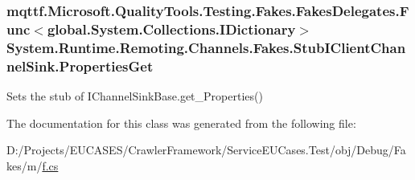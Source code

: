 \hypertarget{class_system_1_1_runtime_1_1_remoting_1_1_channels_1_1_fakes_1_1_stub_i_client_channel_sink_ac3ed92a79aa3be35b2fd586db7132eac}{
\subsubsection[{Properties\-Get}]{\setlength{\rightskip}{0pt plus 5cm}mqttf.\-Microsoft.\-Quality\-Tools.\-Testing.\-Fakes.\-Fakes\-Delegates.\-Func$<$global.\-System.\-Collections.\-I\-Dictionary$>$ System.\-Runtime.\-Remoting.\-Channels.\-Fakes.\-Stub\-I\-Client\-Channel\-Sink.\-Properties\-Get}}\label{class_system_1_1_runtime_1_1_remoting_1_1_channels_1_1_fakes_1_1_stub_i_client_channel_sink_ac3ed92a79aa3be35b2fd586db7132eac}


Sets the stub of I\-Channel\-Sink\-Base.\-get\-\_\-\-Properties()



The documentation for this class was generated from the following file\-:\begin{DoxyCompactItemize}
\item 
D\-:/\-Projects/\-E\-U\-C\-A\-S\-E\-S/\-Crawler\-Framework/\-Service\-E\-U\-Cases.\-Test/obj/\-Debug/\-Fakes/m/\hyperlink{m_2f_8cs}{f.\-cs}\end{DoxyCompactItemize}
